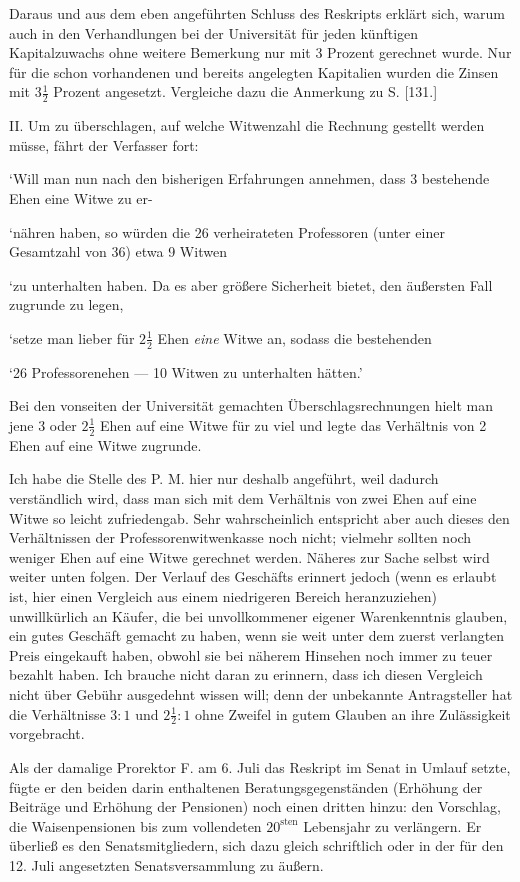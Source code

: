Daraus und aus dem eben angeführten Schluss des Reskripts erklärt sich, warum auch in den Verhandlungen bei der Universität für jeden künftigen Kapitalzuwachs ohne weitere Bemerkung nur mit 3 Prozent gerechnet wurde. Nur für die schon vorhandenen und bereits angelegten Kapitalien wurden die Zinsen mit \(3\tfrac12\) Prozent angesetzt. Vergleiche dazu die Anmerkung zu S. [131.]

II. Um zu überschlagen, auf welche Witwenzahl die Rechnung gestellt werden müsse, fährt der Verfasser fort:

‘Will man nun nach den bisherigen Erfahrungen annehmen, dass 3 bestehende Ehen eine Witwe zu er-\par
\noindent ‘nähren haben, so würden die 26 verheirateten Professoren (unter einer Gesamtzahl von 36) etwa 9 Witwen\par
\noindent ‘zu unterhalten haben. Da es aber größere Sicherheit bietet, den äußersten Fall zugrunde zu legen,\par
\noindent ‘setze man lieber für \(2\tfrac12\) Ehen \textit{eine} Witwe an, sodass die bestehenden\par
\noindent ‘26 Professorenehen — 10 Witwen zu unterhalten hätten.’
\par{}
Bei den vonseiten der Universität gemachten Überschlagsrechnungen hielt man jene 3 oder \(2\tfrac12\) Ehen auf eine Witwe für zu viel und legte das Verhältnis von 2 Ehen auf eine Witwe zugrunde.

Ich habe die Stelle des P. M. hier nur deshalb angeführt, weil dadurch verständlich wird, dass man sich mit dem Verhältnis von zwei Ehen auf eine Witwe so leicht zufriedengab. Sehr wahrscheinlich entspricht aber auch dieses den Verhältnissen der Professorenwitwenkasse noch nicht; vielmehr sollten noch weniger Ehen auf eine Witwe gerechnet werden. Näheres zur Sache selbst wird weiter unten folgen. Der Verlauf des Geschäfts erinnert jedoch (wenn es erlaubt ist, hier einen Vergleich aus einem niedrigeren Bereich heranzuziehen) unwillkürlich an Käufer, die bei unvollkommener eigener Warenkenntnis glauben, ein gutes Geschäft gemacht zu haben, wenn sie weit unter dem zuerst verlangten Preis eingekauft haben, obwohl sie bei näherem Hinsehen noch immer zu teuer bezahlt haben. Ich brauche nicht daran zu erinnern, dass ich diesen Vergleich nicht über Gebühr ausgedehnt wissen will; denn der unbekannte Antragsteller hat die Verhältnisse \(3:1\) und \(2\tfrac12:1\) ohne Zweifel in gutem Glauben an ihre Zulässigkeit vorgebracht.

Als der damalige Prorektor F. am 6. Juli das Reskript im Senat in Umlauf setzte, fügte er den beiden darin enthaltenen Beratungsgegenständen (Erhöhung der Beiträge und Erhöhung der Pensionen) noch einen dritten hinzu: den Vorschlag, die Waisenpensionen bis zum vollendeten \(20^{\text{sten}}\) Lebensjahr zu verlängern. Er überließ es den Senatsmitgliedern, sich dazu gleich schriftlich oder in der für den 12. Juli angesetzten Senatsversammlung zu äußern.

